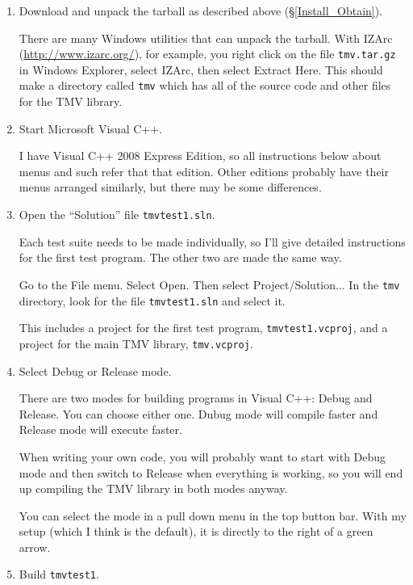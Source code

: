 \begin{enumerate}
\item Download and unpack the tarball as described above (\S\ref{Install_Obtain}).

There are many Windows utilities that can unpack the
tarball.  With IZArc (\url{http://www.izarc.org/}), for example, you right click on the file 
\texttt{tmv\tmvversion.tar.gz}
in Windows Explorer, select IZArc, then select Extract Here.  This should make a directory
called \texttt{tmv\tmvversion} which has all of the source code and other files for the TMV library.

\item
Start Microsoft Visual C++.  

I have Visual C++ 2008 Express Edition, so all instructions below
about menus and such refer that that edition.  Other editions probably have their 
menus arranged similarly, but there may be some differences.

\item
Open the ``Solution'' file \texttt{tmvtest1.sln}.

Each test suite needs to be made individually, so I'll give detailed instructions for the first
test program.  The other two are made the same way.

Go to the File menu.  Select Open.  Then select Project/Solution...
In the \texttt{tmv\tmvversion} directory, look for the file
\texttt{tmvtest1.sln} and select it.  

This includes a project for the first test program, \texttt{tmvtest1.vcproj}, and a project for
the main TMV library, \texttt{tmv.vcproj}.

\item
Select Debug or Release mode.

There are two modes for building programs in Visual C++: Debug and Release.  
You can choose either one.  Dubug mode will compile faster and 
Release mode will execute faster.  

When writing 
your own code, you will probably want to start with Debug mode and then switch to Release
when everything is working, so you will end up compiling the TMV library in both modes anyway.

You can select the mode in a pull down menu in the top button bar.  With my setup
(which I think is the default), it is directly to the right of a green arrow.

\item
Build \texttt{tmvtest1}.


\end{enumerate}
